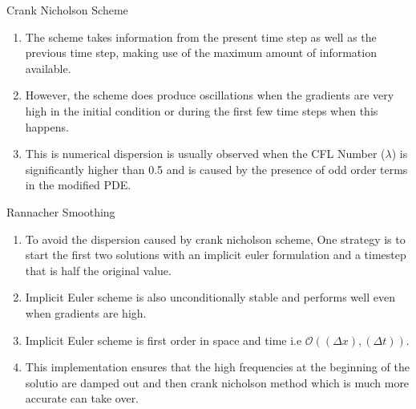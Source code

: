 \documentclass[10pt,compress]{beamer}
\begin{document}
\begin{frame}{Crank Nicholson Scheme}
\begin{enumerate}
\item The scheme takes information from the present time step as well as the previous time step, making use of the maximum amount of information available.
\item However, the scheme does produce oscillations when the gradients are very high in the initial condition or during the first few time steps when this happens.
\item This is numerical dispersion is usually observed when the CFL Number ($\lambda$) is significantly higher than 0.5 and is caused by the presence of odd order terms in the modified PDE.
\end{enumerate}
\end{frame}

\begin{frame}{Rannacher Smoothing}
\begin{enumerate}
\item To avoid the dispersion caused by crank nicholson scheme, One strategy is to start the first two solutions with an implicit euler formulation and a timestep that is half the original value.
\item Implicit Euler scheme is also unconditionally stable and performs well even when gradients are high.
\item Implicit Euler scheme is first order in space and time i.e $\mathcal{O}((\Delta x),(\Delta t))$.
\item This implementation ensures that the high frequencies at the beginning of the solutio are damped out and then crank nicholson method which is much more accurate can take over.
\end{enumerate}
\end{frame}
\end{document}
